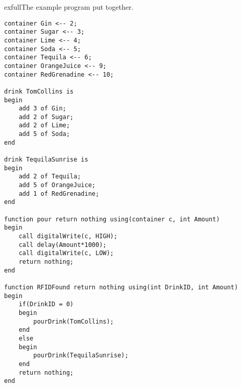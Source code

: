 \begin{code}{exfull}{The example program put together.}
\begin{lstlisting}
container Gin <-- 2;
container Sugar <-- 3;
container Lime <-- 4;
container Soda <-- 5;
container Tequila <-- 6;
container OrangeJuice <-- 9;
container RedGrenadine <-- 10;

drink TomCollins is
begin
	add 3 of Gin;
	add 2 of Sugar;
	add 2 of Lime;
	add 5 of Soda;
end

drink TequilaSunrise is 
begin
	add 2 of Tequila;
	add 5 of OrangeJuice;
	add 1 of RedGrenadine;
end

function pour return nothing using(container c, int Amount)
begin
	call digitalWrite(c, HIGH);
	call delay(Amount*1000);
	call digitalWrite(c, LOW);
	return nothing;
end

function RFIDFound return nothing using(int DrinkID, int Amount)
begin
	if(DrinkID = 0)
	begin
		pourDrink(TomCollins);
	end
	else
	begin
		pourDrink(TequilaSunrise);
	end
	return nothing;
end
\end{lstlisting}
\end{code}